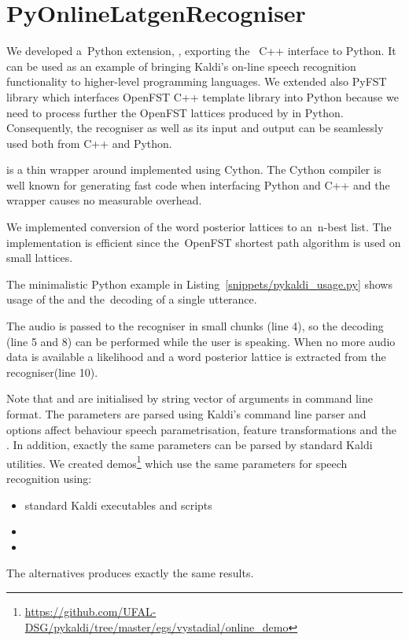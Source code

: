 \section{PyOnlineLatgenRecogniser}
\label{sec:pyext}

We developed a~Python extension, , exporting the~ C++ interface to Python.
It can be used as an example of bringing Kaldi's on-line speech recognition functionality to higher-level programming languages.
We extended also PyFST library\cite{pyfst2014url} which interfaces OpenFST C++ template library into Python because we need to process further the OpenFST lattices produced by  in Python.
Consequently, the recogniser as well as its input and output can be seamlessly used both from C++ and Python.

 is a thin wrapper around  implemented using Cython\cite{cython2014url}.
The Cython compiler is well known for generating fast code when interfacing Python and C++ and the wrapper causes no measurable overhead.

We implemented conversion of the word posterior lattices to an~n-best list.
The implementation is efficient since the~OpenFST shortest path algorithm is used on small lattices.

The minimalistic Python example in Listing~\ref{snippets/pykaldi_usage.py} shows usage of the  and the~decoding of a single utterance.

The audio is passed to the recogniser in small chunks (line 4), so the decoding (line 5 and 8) can be performed while the user is speaking.
When no more audio data is available a likelihood and a word posterior lattice is extracted from the recogniser(line 10).

Note that  and  are initialised by string vector of arguments in command line format.
The parameters are parsed using Kaldi's command line parser and options affect behaviour speech parametrisation, feature transformations and  the .
In addition, exactly the same parameters can be parsed by standard Kaldi utilities. 
We created demos\footnote{\url{https://github.com/UFAL-DSG/pykaldi/tree/master/egs/vystadial/online_demo}} which use the same parameters for speech recognition using:
\begin{itemize}
    \item standard Kaldi executables and scripts
    \item {} 
    \item {}
\end{itemize}
The alternatives produces exactly the same results.

